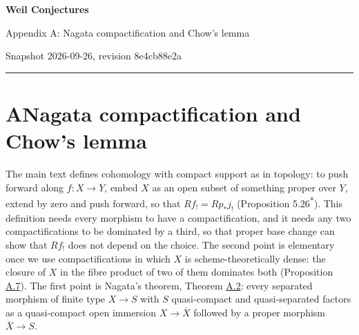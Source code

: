 \documentclass[11pt]{article}
\newcommand{\bpout}[1]{#1\textsuperscript{\hyperlink{bp-outside}{\ensuremath{\ast}}}}
\begin{document}
\pagestyle{plain}
\begin{center}
{\LARGE\bfseries Weil Conjectures\par}
\vspace{0.7em}
{\large Appendix A: Nagata compactification and Chow's lemma\par}
\vspace{0.5em}
{\small\color{bpmuted}Snapshot 2026-09-26, revision 8e4cb88e2a\par}
\end{center}
\vspace{0.5em}
{\small\tableofcontents}
\bigskip\hrule\bigskip

\section*{\texorpdfstring{A\quad Nagata compactification and Chow's lemma}{A Nagata compactification and Chow's lemma}}
\label{bp1}%
\label{bp2}%
The main text defines cohomology with compact support as in topology: to push forward along \(f:X\to Y\), embed \(X\) as an open subset of something proper over \(Y\), extend by zero and push forward, so that \(Rf_!=Rp_*j_!\) (Proposition \bpout{5.26}). This definition needs every morphism to have a compactification, and it needs any two compactifications to be dominated by a third, so that proper base change can show that \(Rf_!\) does not depend on the choice. The second point is elementary once we use compactifications in which \(X\) is scheme-theoretically dense: the closure of \(X\) in the fibre product of two of them dominates both (Proposition \hyperref[bp19]{A.7}). The first point is Nagata's theorem, Theorem \hyperref[bp7]{A.2}: every separated morphism of finite type \(X\to S\) with \(S\) quasi-compact and quasi-separated factors as a quasi-compact open immersion \(X\to\overline
X\) followed by a proper morphism \(\overline X\to S\).
\end{document}
